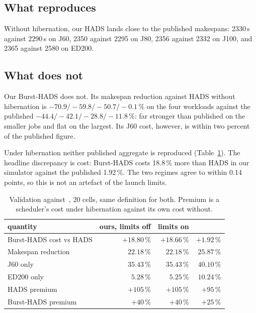 \documentclass[conference]{IEEEtran}
\begin{document}
\subsection{What reproduces}

Without hibernation, our HADS lands close to the published makespans:
2330\,s against 2290\,s on J60, 2350 against 2295 on J80, 2356 against 2332 on
J100, and 2365 against 2580 on ED200.

\subsection{What does not}

Our Burst-HADS does not. Its makespan reduction against HADS without
hibernation is $-70.9/-59.8/-50.7/-0.1\,\%$ on the four workloads against the
published $-44.4/-42.1/-28.8/-11.8\,\%$: far stronger than published on the
smaller jobs and flat on the largest. Its J60 cost, however, is within two
percent of the published figure.

Under hibernation neither published aggregate is reproduced
(Table~\ref{tab:validation}). The headline discrepancy is cost: Burst-HADS
costs 18.8\,\% more than HADS in our simulator against the published 1.92\,\%.
The two regimes agree to within 0.14 points, so this is not an artefact of the
launch limits.

\begin{table}[!t]
\caption{Validation against~\cite[Table~9]{teylo2023}, 20 cells, same
definition for both. Premium is a scheduler's cost under hibernation against
its own cost without.}
\label{tab:validation}
\centering
\small
\begin{tabular}{@{}lrrr@{}}
\toprule
quantity & ours, limits off & limits on & \cite{teylo2023} \\
\midrule
Burst-HADS cost vs HADS & $+18.80\,\%$ & $+18.66\,\%$ & $+1.92\,\%$ \\
Makespan reduction & $22.18\,\%$ & $22.18\,\%$ & $25.87\,\%$ \\
\quad J60 only & $35.43\,\%$ & $35.43\,\%$ & $40.10\,\%$ \\
\quad ED200 only & $5.28\,\%$ & $5.25\,\%$ & $10.24\,\%$ \\
HADS premium & $+105\,\%$ & $+105\,\%$ & $+95\,\%$ \\
Burst-HADS premium & $+40\,\%$ & $+40\,\%$ & $+25\,\%$ \\
\bottomrule
\end{tabular}
\end{table}
\end{document}
